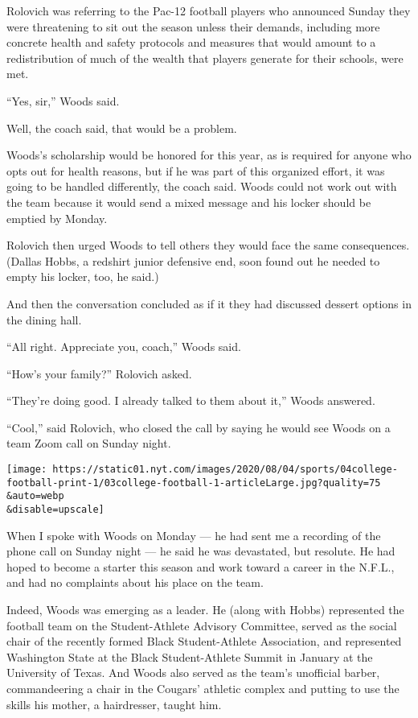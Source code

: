 Rolovich was referring to the Pac-12 football players who announced
Sunday they were threatening to sit out the season unless their demands,
including more concrete health and safety protocols and measures that
would amount to a redistribution of much of the wealth that players
generate for their schools, were met.

``Yes, sir,'' Woods said.

Well, the coach said, that would be a problem.

Woods's scholarship would be honored for this year, as is required for
anyone who opts out for health reasons, but if he was part of this
organized effort, it was going to be handled differently, the coach
said. Woods could not work out with the team because it would send a
mixed message and his locker should be emptied by Monday.

Rolovich then urged Woods to tell others they would face the same
consequences. (Dallas Hobbs, a redshirt junior defensive end, soon found
out he needed to empty his locker, too, he said.)

And then the conversation concluded as if it they had discussed dessert
options in the dining hall.

``All right. Appreciate you, coach,'' Woods said.

``How's your family?'' Rolovich asked.

``They're doing good. I already talked to them about it,'' Woods
answered.

``Cool,'' said Rolovich, who closed the call by saying he would see
Woods on a team Zoom call on Sunday night.

\texttt{[image: https://static01.nyt.com/images/2020/08/04/sports/04college-football-print-1/03college-football-1-articleLarge.jpg?quality=75\\\&auto=webp\\\&disable=upscale]}

When I spoke with Woods on Monday --- he had sent me a recording of the
phone call on Sunday night --- he said he was devastated, but resolute.
He had hoped to become a starter this season and work toward a career in
the N.F.L., and had no complaints about his place on the team.

Indeed, Woods was emerging as a leader. He (along with Hobbs)
represented the football team on the Student-Athlete Advisory Committee,
served as the social chair of the recently formed Black Student-Athlete
Association, and represented Washington State at the Black
Student-Athlete Summit in January at the University of Texas. And Woods
also served as the team's unofficial barber, commandeering a chair in
the Cougars' athletic complex and putting to use the skills his mother,
a hairdresser, taught him.

